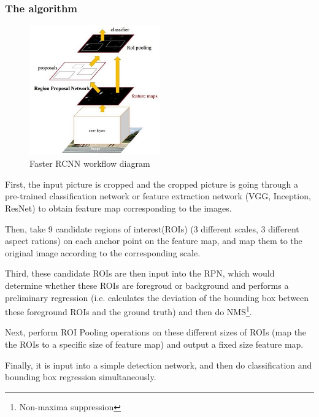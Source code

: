 \subsubsection{The algorithm}
\begin{figure}[h!]
    \centering
    \includegraphics[width=0.5\textwidth]{Chapters/Fig/frrcnn.png}
    \caption{Faster RCNN workflow diagram}
    \label{fig:frrcnn_workflow}
\end{figure}
\hspace{0.5cm}First, the input picture is cropped and the cropped picture is going through a pre-trained classification network or feature extraction network (VGG, Inception, ResNet) to obtain feature map corresponding to the images.\par
Then, take 9 candidate regions of interest(ROIs) (3 different scales, 3 different aspect rations) on each anchor point on the feature map, and map them to the original image according to the corresponding scale.\par
Third, these candidate ROIs are then input into the RPN, which would determine whether these ROIs are foregroud or background and performs a preliminary regression (i.e. calculates the deviation of the bounding box between these foreground ROIs and the ground truth) and then do NMS\footnote{Non-maxima suppression}.\par
Next, perform ROI Pooling operations on these different sizes of ROIs (map the the ROIs to a specific size of feature map) and output a fixed size feature map.\par
Finally, it is input into a simple detection network, and then do classification and bounding box regression simultaneously.
